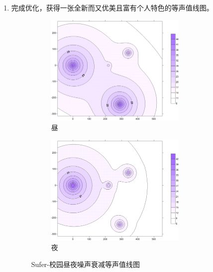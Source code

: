 \begin{enumerate}
\begin{enumerate}[label=\arabic*)]
        \item 完成优化，获得一张全新而又优美且富有个人特色的等声值线图。
        \begin{figure}[H]
            \centering
            \begin{subfigure}[h]{\textwidth}
                \centering
                \includegraphics[width=0.8\textwidth]{figures/Campus noise attenuation plot-daytime.png}
                \caption{昼}
            \end{subfigure}
            \begin{subfigure}[h]{\textwidth}
                \centering
                \includegraphics[width=0.8\textwidth]{figures/Campus noise attenuation plot-nighttime.png}
                \caption{夜}
            \end{subfigure}
            \caption{Sufer-校园昼夜噪声衰减等声值线图}
            \label{fig:Sufer-Isoacoustic line diagram of campus day and night noise attenuation}
        \end{figure}
    \end{enumerate}
\end{enumerate}


